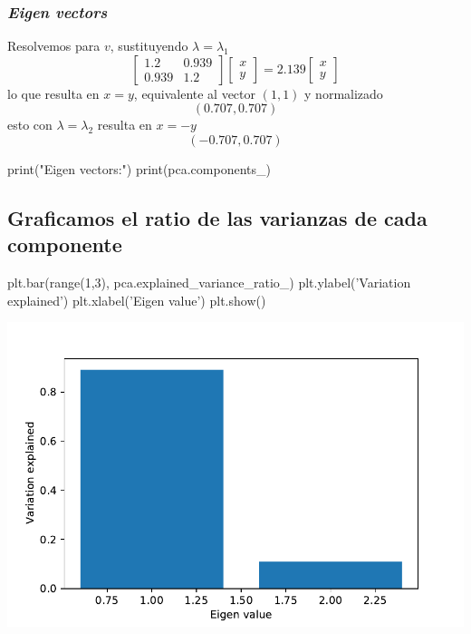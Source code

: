 \subsubsection{\textit{Eigen vectors}}
\begin{minipage}[c]{0.48\textwidth}
Resolvemos para $v$, sustituyendo $\lambda=\lambda_1$
\[ \begin{bmatrix}
1.2 & 0.939\\
0.939 & 1.2
\end{bmatrix}
\begin{bmatrix}
x\\
y
\end{bmatrix} = 2.139
\begin{bmatrix}
x\\
y
\end{bmatrix}\]
lo que resulta en $x=y$, equivalente al vector $(1,1)$ y normalizado\vspace{-0.4em}
\[ (0.707, 0.707) \]
esto con $\lambda=\lambda_2$ resulta en $x=-y$\vspace{-0.4em}
\[ (-0.707, 0.707) \]
\end{minipage}
\hfill\vrule\hfill
\begin{minipage}[c]{0.48\textwidth}
\begin{jupyter}{7}
print("Eigen vectors:")
print(pca.components_)
\end{jupyter}
\end{minipage}\newpage

\subsection{Graficamos el ratio de las varianzas de cada componente}\label{PCAmath-scree}
\begin{jupyter}{8}
plt.bar(range(1,3), pca.explained_variance_ratio_)
plt.ylabel('Variation explained')
plt.xlabel('Eigen value')
plt.show()
\end{jupyter}
\begin{center}
\includegraphics[scale=0.75]{media/profesores/barras.pdf}
\end{center}

